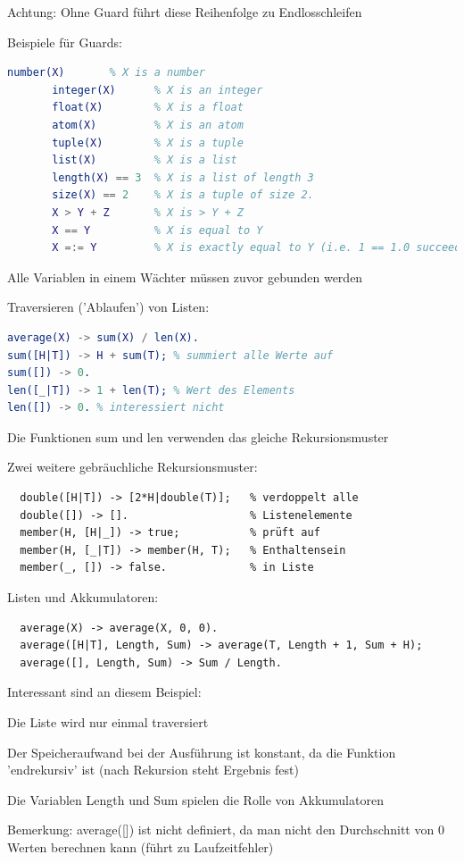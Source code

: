 \documentclass[10pt]{article}
\begin{document}
\begin{itemize*}
\begin{itemize*}
\begin{itemize*}
      \item Achtung: Ohne Guard führt diese Reihenfolge zu Endlosschleifen
    \end{itemize*}
    \item Beispiele für Guards:
    \begin{lstlisting}[language=erlang]
       number(X)       % X is a number
       integer(X)      % X is an integer
       float(X)        % X is a float
       atom(X)         % X is an atom
       tuple(X)        % X is a tuple
       list(X)         % X is a list
       length(X) == 3  % X is a list of length 3
       size(X) == 2    % X is a tuple of size 2.
       X > Y + Z       % X is > Y + Z
       X == Y          % X is equal to Y
       X =:= Y         % X is exactly equal to Y (i.e. 1 == 1.0 succeeds but 1 =:= 1.0 fails)
    \end{lstlisting}
    \item Alle Variablen in einem Wächter müssen zuvor gebunden werden
  \end{itemize*}
\end{itemize*}

Traversieren ('Ablaufen') von Listen:
\begin{lstlisting}[language=erlang]
average(X) -> sum(X) / len(X).
sum([H|T]) -> H + sum(T); % summiert alle Werte auf
sum([]) -> 0.
len([_|T]) -> 1 + len(T); % Wert des Elements
len([]) -> 0. % interessiert nicht
\end{lstlisting}
\begin{itemize*}
  \item Die Funktionen sum und len verwenden das gleiche Rekursionsmuster
  \item Zwei weitere gebräuchliche Rekursionsmuster:
  \begin{lstlisting}
  double([H|T]) -> [2*H|double(T)];   % verdoppelt alle
  double([]) -> [].                   % Listenelemente
  member(H, [H|_]) -> true;           % prüft auf
  member(H, [_|T]) -> member(H, T);   % Enthaltensein
  member(_, []) -> false.             % in Liste
  \end{lstlisting}
\end{itemize*}

Listen und Akkumulatoren:
\begin{lstlisting}
  average(X) -> average(X, 0, 0).
  average([H|T], Length, Sum) -> average(T, Length + 1, Sum + H);
  average([], Length, Sum) -> Sum / Length.
\end{lstlisting}
\begin{itemize*}
  \item Interessant sind an diesem Beispiel:
  \item Die Liste wird nur einmal traversiert
  \item Der Speicheraufwand bei der Ausführung ist konstant, da die Funktion 'endrekursiv' ist (nach Rekursion steht Ergebnis fest)
  \item Die Variablen Length und Sum spielen die Rolle von Akkumulatoren
  \item Bemerkung: average([]) ist nicht definiert, da man nicht den Durchschnitt von 0 Werten berechnen kann (führt zu Laufzeitfehler)
\end{itemize*}
\end{document}
